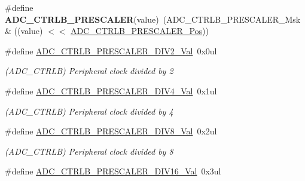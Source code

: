 \begin{DoxyCompactItemize}
\item 
\hypertarget{group___s_a_m_l21___a_d_c_ga9717ff4851d2f7e81e81789397dc5e14}{}\#define {\bfseries A\+D\+C\+\_\+\+C\+T\+R\+L\+B\+\_\+\+P\+R\+E\+S\+C\+A\+L\+E\+R}(value)~(A\+D\+C\+\_\+\+C\+T\+R\+L\+B\+\_\+\+P\+R\+E\+S\+C\+A\+L\+E\+R\+\_\+\+Msk \& ((value) $<$$<$ \hyperlink{group___s_a_m_l21___a_d_c_ga67bbef18402c0d73dcc1698fa185ab76}{A\+D\+C\+\_\+\+C\+T\+R\+L\+B\+\_\+\+P\+R\+E\+S\+C\+A\+L\+E\+R\+\_\+\+Pos}))\label{group___s_a_m_l21___a_d_c_ga9717ff4851d2f7e81e81789397dc5e14}

\item 
\hypertarget{group___s_a_m_l21___a_d_c_gaf57a292b2555153261bdf72996215124}{}\#define \hyperlink{group___s_a_m_l21___a_d_c_gaf57a292b2555153261bdf72996215124}{A\+D\+C\+\_\+\+C\+T\+R\+L\+B\+\_\+\+P\+R\+E\+S\+C\+A\+L\+E\+R\+\_\+\+D\+I\+V2\+\_\+\+Val}~0x0ul\label{group___s_a_m_l21___a_d_c_gaf57a292b2555153261bdf72996215124}

\begin{DoxyCompactList}\small\item\em (A\+D\+C\+\_\+\+C\+T\+R\+L\+B) Peripheral clock divided by 2 \end{DoxyCompactList}\item 
\hypertarget{group___s_a_m_l21___a_d_c_gaba2eeed7d542b9de1eb9a50e78acd772}{}\#define \hyperlink{group___s_a_m_l21___a_d_c_gaba2eeed7d542b9de1eb9a50e78acd772}{A\+D\+C\+\_\+\+C\+T\+R\+L\+B\+\_\+\+P\+R\+E\+S\+C\+A\+L\+E\+R\+\_\+\+D\+I\+V4\+\_\+\+Val}~0x1ul\label{group___s_a_m_l21___a_d_c_gaba2eeed7d542b9de1eb9a50e78acd772}

\begin{DoxyCompactList}\small\item\em (A\+D\+C\+\_\+\+C\+T\+R\+L\+B) Peripheral clock divided by 4 \end{DoxyCompactList}\item 
\hypertarget{group___s_a_m_l21___a_d_c_ga5c595885e48c5b30373553f9bc85c5e2}{}\#define \hyperlink{group___s_a_m_l21___a_d_c_ga5c595885e48c5b30373553f9bc85c5e2}{A\+D\+C\+\_\+\+C\+T\+R\+L\+B\+\_\+\+P\+R\+E\+S\+C\+A\+L\+E\+R\+\_\+\+D\+I\+V8\+\_\+\+Val}~0x2ul\label{group___s_a_m_l21___a_d_c_ga5c595885e48c5b30373553f9bc85c5e2}

\begin{DoxyCompactList}\small\item\em (A\+D\+C\+\_\+\+C\+T\+R\+L\+B) Peripheral clock divided by 8 \end{DoxyCompactList}\item 
\hypertarget{group___s_a_m_l21___a_d_c_gae9c4228a9a26ca419668edabde055ca4}{}\#define \hyperlink{group___s_a_m_l21___a_d_c_gae9c4228a9a26ca419668edabde055ca4}{A\+D\+C\+\_\+\+C\+T\+R\+L\+B\+\_\+\+P\+R\+E\+S\+C\+A\+L\+E\+R\+\_\+\+D\+I\+V16\+\_\+\+Val}~0x3ul\label{group___s_a_m_l21___a_d_c_gae9c4228a9a26ca419668edabde055ca4}


\end{DoxyCompactItemize}
